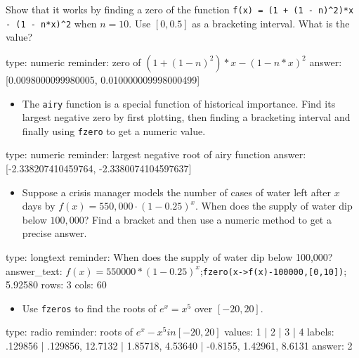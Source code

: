 \documentclass[12pt]{article}
\begin{document}
Show that it works by finding a zero of the function
\texttt{f(x) = (1 + (1 - n)\^{}2)*x - (1 - n*x)\^{}2} when $n=10$. Use
$[0, 0.5]$ as a bracketing interval. What is the value?

\begin{answer}
    type: numeric
    reminder: zero of  \( (1 + (1-n)^2)*x - (1-n*x)^2 \)
    answer: [0.0098000099980005, 0.010000009998000499]

\end{answer}

\begin{itemize}
\itemsep1pt\parskip0pt
\item
  The \texttt{airy} function is a special function of historical
  importance. Find its largest negative zero by first plotting, then
  finding a bracketing interval and finally using \texttt{fzero} to get
  a numeric value.
\end{itemize}

\begin{answer}
    type: numeric
    reminder: largest negative root of airy function
    answer: [-2.338207410459764, -2.3380074104597637]

\end{answer}

\begin{itemize}
\itemsep1pt\parskip0pt
\item
  Suppose a crisis manager models the number of cases of water left
  after $x$ days by $f(x) = 550,000 \cdot (1 - 0.25)^x$. When does the
  supply of water dip below $100,000$? Find a bracket and then use a
  numeric method to get a precise answer.
\end{itemize}

\begin{answer}
type: longtext
reminder: When does the supply of water dip below 100,000?
answer_text: \(f(x) = 550000*(1-0.25)^x\);\verb+fzero(x->f(x)-100000,[0,10])+; 5.92580 
rows: 3
cols: 60
\end{answer}

\begin{itemize}
\itemsep1pt\parskip0pt
\item
  Use \texttt{fzeros} to find the roots of $e^x = x^5$ over $[-20,20]$.
\end{itemize}

\begin{answer}
type: radio
reminder: roots of \( e^x - x^5 in [-20,20] \)
values: 1 | 2 | 3 | 4
labels: .129856 | .129856, 12.7132 | 1.85718, 4.53640 | -0.8155, 1.42961, 8.6131
answer: 2
\end{answer}
\end{document}
